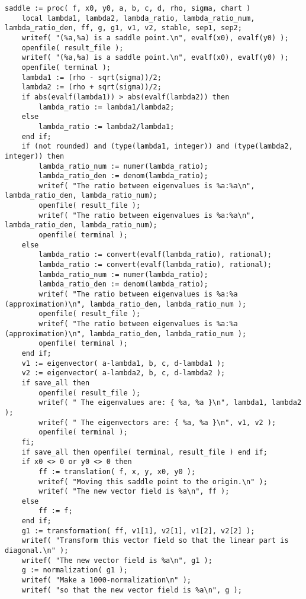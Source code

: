 \documentclass[a4paper,10pt]{article}
\begin{document}
\begin{lstlisting}[name=type]
saddle := proc( f, x0, y0, a, b, c, d, rho, sigma, chart )
    local lambda1, lambda2, lambda_ratio, lambda_ratio_num, lambda_ratio_den, ff, g, g1, v1, v2, stable, sep1, sep2;
    writef( "(%a,%a) is a saddle point.\n", evalf(x0), evalf(y0) );
    openfile( result_file );
    writef( "(%a,%a) is a saddle point.\n", evalf(x0), evalf(y0) );
    openfile( terminal );
    lambda1 := (rho - sqrt(sigma))/2;
    lambda2 := (rho + sqrt(sigma))/2;
    if abs(evalf(lambda1)) > abs(evalf(lambda2)) then
        lambda_ratio := lambda1/lambda2;
    else
        lambda_ratio := lambda2/lambda1;
    end if;
    if (not rounded) and (type(lambda1, integer)) and (type(lambda2, integer)) then 
        lambda_ratio_num := numer(lambda_ratio);
        lambda_ratio_den := denom(lambda_ratio);
        writef( "The ratio between eigenvalues is %a:%a\n", lambda_ratio_den, lambda_ratio_num);
        openfile( result_file );
        writef( "The ratio between eigenvalues is %a:%a\n", lambda_ratio_den, lambda_ratio_num);
        openfile( terminal );
    else
        lambda_ratio := convert(evalf(lambda_ratio), rational);
        lambda_ratio := convert(evalf(lambda_ratio), rational);        
        lambda_ratio_num := numer(lambda_ratio);
        lambda_ratio_den := denom(lambda_ratio);
        writef( "The ratio between eigenvalues is %a:%a (approximation)\n", lambda_ratio_den, lambda_ratio_num );
        openfile( result_file );
        writef( "The ratio between eigenvalues is %a:%a (approximation)\n", lambda_ratio_den, lambda_ratio_num );
        openfile( terminal );
    end if;
    v1 := eigenvector( a-lambda1, b, c, d-lambda1 );
    v2 := eigenvector( a-lambda2, b, c, d-lambda2 );
    if save_all then
        openfile( result_file );
        writef( " The eigenvalues are: { %a, %a }\n", lambda1, lambda2 );
        writef( " The eigenvectors are: { %a, %a }\n", v1, v2 );
        openfile( terminal );
    fi;
    if save_all then openfile( terminal, result_file ) end if;
    if x0 <> 0 or y0 <> 0 then
        ff := translation( f, x, y, x0, y0 );
        writef( "Moving this saddle point to the origin.\n" );
        writef( "The new vector field is %a\n", ff );
    else
        ff := f;
    end if;
    g1 := transformation( ff, v1[1], v2[1], v1[2], v2[2] );
    writef( "Transform this vector field so that the linear part is diagonal.\n" );
    writef( "The new vector field is %a\n", g1 );
    g := normalization( g1 );
    writef( "Make a 1000-normalization\n" );
    writef( "so that the new vector field is %a\n", g );

\end{lstlisting}
\end{document}
